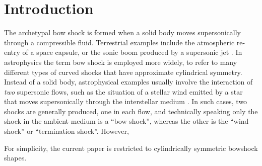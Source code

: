 \section{Introduction}
\label{sec:intro}


The archetypal bow shock is formed when a solid body moves
supersonically through a compressible fluid.  Terrestrial examples
include the atmospheric re-entry of a space capsule, or the sonic boom
produced by a supersonic jet \citep{van-Dyke:1982a}.  In astrophysics
the term bow shock is employed more widely, to refer to many different
types of curved shocks that have approximate cylindrical symmetry.
Instead of a solid body, astrophysical examples usually involve the
interaction of \emph{two} supersonic flows, such as the situation of a
stellar wind emitted by a star that moves supersonically through the
interstellar medium \citep{}.  In such cases, two shocks are generally
produced, one in each flow, and technically speaking only the shock in
the ambient medium is a ``bow shock'', whereas the other is the ``wind
shock'' or ``termination shock''.  However, 




For simplicity, the current paper is restricted to cylindrically
symmetric bowshock shapes. 



